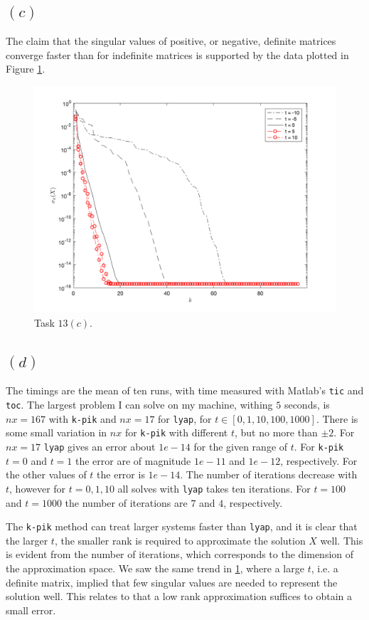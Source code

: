 \subsection*{$(c)$}
The claim that the singular values of positive, or negative, definite matrices converge faster than for indefinite matrices is supported by the data plotted in Figure \ref{13c}.
\begin{figure}[h!]
\centering
\includegraphics[scale=0.5]{task13c.png}
\caption{Task $13(c)$. }
\label{13c}
\end{figure}




\subsection*{$(d)$}
The timings are the mean of ten runs, with time measured with Matlab's \texttt{tic} and \texttt{toc}. The largest problem I can solve on my machine, withing $5$ seconds, is $nx = 167$ with \texttt{k-pik} and $nx = 17$ for \texttt{lyap}, for $t\in[0,1,10,100,1000]$. There is some small variation in $nx$ for \texttt{k-pik} with different $t$, but no more than $\pm 2$. For $nx = 17$  \texttt{lyap} gives an error about $1e-14$ for the given range of $t$. For \texttt{k-pik} $t=0$ and $t = 1$ the error are of magnitude $1e-11$ and $1e-12$, respectively. For the other values of $t$ the error is $1e-14$. The number of iterations decrease with $t$, however for $t = 0,1,10$ all solves with \texttt{lyap} takes ten iterations. For $t = 100$ and $t = 1000$ the number of iterations are $7$ and $4$, respectively.

The \texttt{k-pik} method can treat larger systems faster than \texttt{lyap}, and it is clear that the  larger $t$, the smaller rank is required to approximate the  solution $X$ well. This is evident from the number of iterations, which corresponds to the dimension of the approximation space. We saw the same trend in \ref{13c}, where a large $t$, i.e. a definite matrix, implied that few singular values are needed to represent the solution well. This relates to that a low rank approximation suffices to obtain a small error.
